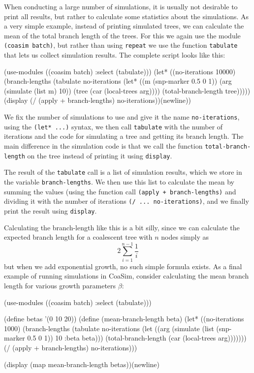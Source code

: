 \documentclass{manual}
\begin{document}
When conducting a large number of simulations, it is usually not
desirable to print all results, but rather to calculate some
statistics about the simulations.  As a very simple example, instead
of printing simulated trees, we can calculate the mean of the total
branch length of the trees.  For this we again use the module
\texttt{(coasim batch)}, but rather than using \texttt{repeat} we use
the function \texttt{tabulate} that lets us collect simulation
results.  The complete script looks like this:
\begin{code}
(use-modules ((coasim batch) :select (tabulate)))
(let* ((no-iterations 10000)
       (branch-lengths
        (tabulate no-iterations
                  (let* ((m (snp-marker 0.5 0 1))
                         (arg (simulate (list m) 10))
                         (tree (car (local-trees arg))))
                    (total-branch-length tree)))))
  (display (/ (apply + branch-lengths) no-iterations))(newline))
\end{code}

We fix the number of simulations to use and give it the name
\texttt{no-iterations}, using the \texttt{(let* ...)} syntax, we then
call \texttt{tabulate} with the number of iterations and the code for
simulating a tree and getting its branch length.  The main difference
in the simulation code is that we call the function
\texttt{total-branch-length} on the tree instead of printing it using
\texttt{display}.

The result of the \texttt{tabulate} call is a list of simulation
results, which we store in the variable \texttt{branch-lengths}.  We
then use this list to calculate the mean by summing the values (using
the function call \texttt{(apply + branch-lengths)} and dividing it
with the number of iterations \texttt{(/ ... no-iterations)}, and we
finally print the result using \texttt{display}.


Calculating the branch-length like this is a bit silly, since we can
calculate the expected branch length for a coalescent tree with $n$
nodes simply as
\[
  2\sum_{i=1}^{n-1}\frac{1}{i}
\]
but when we add exponential growth, no such simple formula exists.  As
a final example of running simulations in CoaSim, consider calculating
the mean branch length for various growth parameters $\beta$:

\begin{code}
(use-modules ((coasim batch) :select (tabulate)))

(define betas '(0 10 20))
(define (mean-branch-length beta)
  (let* ((no-iterations 1000)
         (branch-lengths
          (tabulate no-iterations
            (let ((arg (simulate (list (snp-marker 0.5 0 1)) 10 :beta beta)))
              (total-branch-length (car (local-trees arg)))))))
    (/ (apply + branch-lengths) no-iterations)))

(display (map mean-branch-length betas))(newline)
\end{code}
\end{document}
